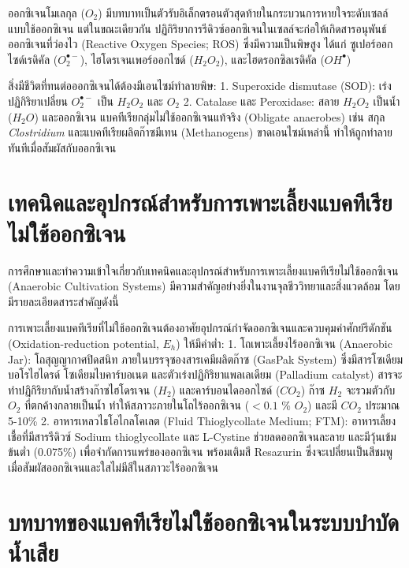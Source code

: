 ออกซิเจนโมเลกุล ($O_2$) มีบทบาทเป็นตัวรับอิเล็กตรอนตัวสุดท้ายในกระบวนการหายใจระดับเซลล์แบบใช้ออกซิเจน แต่ในขณะเดียวกัน ปฏิกิริยาการรีดิวซ์ออกซิเจนในเซลล์จะก่อให้เกิดสารอนุพันธ์ออกซิเจนที่ว่องไว (Reactive Oxygen Species; ROS) ซึ่งมีความเป็นพิษสูง ได้แก่ ซูเปอร์ออกไซด์เรดิคัล ($O_2^{\bullet-}$), ไฮโดรเจนเพอร์ออกไซด์ ($H_2O_2$), และไฮดรอกซิลเรดิคัล ($OH^{\bullet}$)

สิ่งมีชีวิตที่ทนต่อออกซิเจนได้ต้องมีเอนไซม์ทำลายพิษ:
1. Superoxide dismutase (SOD): เร่งปฏิกิริยาเปลี่ยน $O_2^{\bullet-}$ เป็น $H_2O_2$ และ $O_2$
2. Catalase และ Peroxidase: สลาย $H_2O_2$ เป็นน้ำ ($H_2O$) และออกซิเจน
แบคทีเรียกลุ่มไม่ใช้ออกซิเจนแท้จริง (Obligate anaerobes) เช่น สกุล \textit{Clostridium} และแบคทีเรียผลิตก๊าซมีเทน (Methanogens) ขาดเอนไซม์เหล่านี้ ทำให้ถูกทำลายทันทีเมื่อสัมผัสกับออกซิเจน

\section{เทคนิคและอุปกรณ์สำหรับการเพาะเลี้ยงแบคทีเรียไม่ใช้ออกซิเจน}

การศึกษาและทำความเข้าใจเกี่ยวกับเทคนิคและอุปกรณ์สำหรับการเพาะเลี้ยงแบคทีเรียไม่ใช้ออกซิเจน (Anaerobic Cultivation Systems) มีความสำคัญอย่างยิ่งในงานจุลชีววิทยาและสิ่งแวดล้อม โดยมีรายละเอียดสาระสำคัญดังนี้

การเพาะเลี้ยงแบคทีเรียที่ไม่ใช้ออกซิเจนต้องอาศัยอุปกรณ์กำจัดออกซิเจนและควบคุมค่าศักย์รีดักชัน (Oxidation-reduction potential, $E_h$) ให้มีค่าต่ำ:
1. โถเพาะเลี้ยงไร้ออกซิเจน (Anaerobic Jar): โถสุญญากาศปิดสนิท ภายในบรรจุซองสารเคมีผลิตก๊าซ (GasPak System) ซึ่งมีสารโซเดียมบอโรไฮไดรด์ โซเดียมไบคาร์บอเนต และตัวเร่งปฏิกิริยาแพลเลเดียม (Palladium catalyst) สารจะทำปฏิกิริยากับน้ำสร้างก๊าซไฮโดรเจน ($H_2$) และคาร์บอนไดออกไซด์ ($CO_2$) ก๊าซ $H_2$ จะรวมตัวกับ $O_2$ ที่ตกค้างกลายเป็นน้ำ ทำให้สภาวะภายในโถไร้ออกซิเจน ($<0.1$ \% $O_2$) และมี $CO_2$ ประมาณ 5-10\%
2. อาหารเหลวไธโอไกลโคเลต (Fluid Thioglycollate Medium; FTM): อาหารเลี้ยงเชื้อที่มีสารรีดิวซ์ Sodium thioglycollate และ L-Cystine ช่วยลดออกซิเจนละลาย และมีวุ้นเข้มข้นต่ำ (0.075\%) เพื่อจำกัดการแพร่ของออกซิเจน พร้อมเติมสี Resazurin ซึ่งจะเปลี่ยนเป็นสีชมพูเมื่อสัมผัสออกซิเจนและใสไม่มีสีในสภาวะไร้ออกซิเจน

\section{บทบาทของแบคทีเรียไม่ใช้ออกซิเจนในระบบบำบัดน้ำเสีย}

